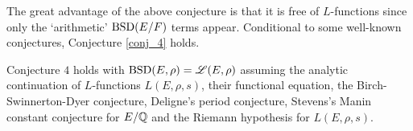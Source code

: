 The great advantage of the above conjecture is that it is free of $L$-functions since only the `arithmetic' $\mathrm{BSD}(E/F)$ terms appear. Conditional to some well-known conjectures, Conjecture \ref{conj_4} holds.

\begin{thm} \cite[Theorem 5]{DEW1}
    Conjecture $4$ holds with $\mathrm{BSD}(E,\rho)=\mathcal{L}(E,\rho)$ assuming the analytic continuation of $L$-functions $L(E,\rho,s)$, their functional equation, the Birch-Swinnerton-Dyer conjecture,
    Deligne's period conjecture, Stevens's Manin constant conjecture for $E/\mathbb{Q}$ and the Riemann
    hypothesis for $L(E,\rho,s)$.
\end{thm}



